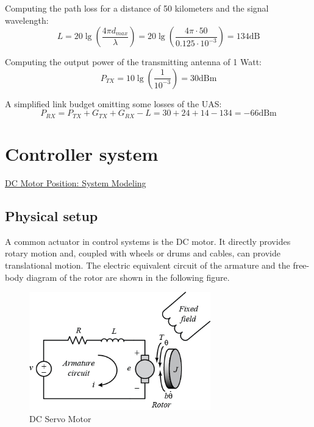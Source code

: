 Computing the path loss for a distance of 50 kilometers and the signal wavelength:
\begin{equation*}\label{eq:tech_parameters3}
	L = 20\lg\left (\frac{4\pi d_{max}}{\lambda} \right)
	  = 20\lg\left (\frac{4\pi \cdot 50}{0.125\cdot 10^{-3}} \right)
	  = 134 \text{dB} 
\end{equation*}

Computing the output power of the transmitting antenna of 1 Watt:
\begin{equation*}\label{eq:tech_parameters4}
	P_{TX} = 10\lg\left (\frac{1}{10^{-3}} \right)  
	       = 30 \text{dBm}
\end{equation*}


A simplified link budget omitting some losses of the UAS:
\begin{equation*}\label{eq:tech_parameters5}
	P_{RX} = P_{TX} + G_{TX} + G_{RX} - L  
	       = 30 + 24 + 14 - 134 = -66 \text{dBm}
\end{equation*}

\section{Controller system}
\href{http://ctms.engin.umich.edu/CTMS/index.php?example=MotorPosition&section=SystemModeling}{DC Motor Position: System Modeling}

\subsection{Physical setup}
A common actuator in control systems is the DC motor. It directly provides rotary motion and, coupled with wheels or drums and cables, can provide translational motion. The electric equivalent circuit of the armature and the free-body diagram of the rotor are shown in the following figure. 

\begin{figure}[h!]\label{fig:motor_model}
	\centering
	\includegraphics[width=0.7\textwidth]{figures/motor.png}
	\caption{DC Servo Motor}
\end{figure}


